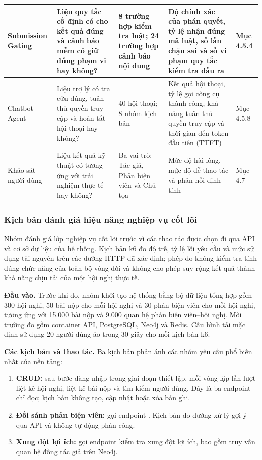 \begin{PrismLongTable}
\begin{longtable}{|P{0.20\textwidth}|P{0.24\textwidth}|C{0.14\textwidth}|P{0.20\textwidth}|C{0.12\textwidth}|}
  Submission Gating     &     Liệu quy tắc cố định có cho kết quả đúng và cảnh báo mềm có giữ đúng phạm vi hay không?     &     8 trường hợp kiểm tra luật; 24 trường hợp cảnh báo nội dung     &     Độ chính xác của phán quyết, tỷ lệ nhận đúng mã luật, số lần chặn sai và số vi phạm quy tắc kiểm tra đầu ra     &     Mục 4.5.4 \\ \hline
  Chatbot Agent      &      Liệu trợ lý có tra cứu đúng, tuân thủ quyền truy cập và hoàn tất hội thoại hay không?      &      40 hội thoại; 8 nhóm kịch bản      &      Kết quả hội thoại, tỷ lệ gọi công cụ thành công, khả năng tuân thủ quyền truy cập và thời gian đến token đầu tiên (TTFT)      &      Mục 4.5.8 \\ \hline
  Khảo sát người dùng     &     Liệu kết quả kỹ thuật có tương ứng với trải nghiệm thực tế hay không?     &     Ba vai trò: Tác giả, Phản biện viên và Chủ tọa     &     Mức độ hài lòng, mức độ dễ thao tác và phản hồi định tính     &     Mục 4.7 \\ \hline
\end{longtable}
\end{PrismLongTable}

\subsubsection{Kịch bản đánh giá hiệu năng nghiệp vụ cốt lõi}

Nhóm đánh giá lớp nghiệp vụ cốt lõi trước vì các thao tác được chọn đi qua API và cơ sở dữ liệu của hệ thống. Kịch bản k6 đo độ trễ, tỷ lệ lỗi yêu cầu và mức sử dụng tài nguyên trên các đường HTTP đã xác định; phép đo không kiểm tra tính đúng chức năng của toàn bộ vòng đời và không cho phép suy rộng kết quả thành khả năng chịu tải của một hội nghị thực tế.

\textbf{Đầu vào.} Trước khi đo, nhóm khởi tạo hệ thống bằng bộ dữ liệu tổng hợp gồm 300 hội nghị, 50 bài nộp cho mỗi hội nghị và 30 phản biện viên cho mỗi hội nghị, tương ứng với 15.000 bài nộp và 9.000 quan hệ phản biện viên--hội nghị. Môi trường đo gồm container API, PostgreSQL, Neo4j và Redis. Cấu hình tải mặc định sử dụng 20 người dùng ảo trong 30 giây cho mỗi kịch bản k6.

\textbf{Các kịch bản và thao tác.} Ba kịch bản phản ánh các nhóm yêu cầu phổ biến nhất của nền tảng:

\begin{enumerate}
  \item \textbf{CRUD:} sau bước đăng nhập trong giai đoạn thiết lập, mỗi vòng lặp lần lượt liệt kê hội nghị, liệt kê bài nộp và tìm kiếm người dùng. Đây là ba endpoint chỉ đọc; kịch bản không tạo, cập nhật hoặc xóa bản ghi.
  \item \textbf{Đối sánh phản biện viên:} gọi endpoint . Kịch bản đo đường xử lý gợi ý qua API và không tự động phân công.
  \item \textbf{Xung đột lợi ích:} gọi endpoint kiểm tra xung đột lợi ích, bao gồm truy vấn quan hệ đồng tác giả trên Neo4j.
\end{enumerate}

